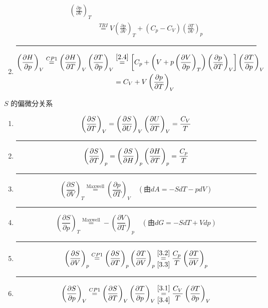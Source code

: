 \begin{example}
\begin{enumerate}
\begin{align*}
            \left(\frac{\partial p}{\partial V}\right)_T \\
            &\overset{TRI}{=}V\left(\frac{\partial p}{\partial V}\right)_T
            +(C_p-C_V)\left(\frac{\partial T}{\partial V}\right)_p
        \end{align*}
        \hrule
        \item \begin{align*}
            \left(\frac{\partial H}{\partial p}\right)_V 
            \overset{CP1}{=} \left(\frac{\partial H}{\partial T}\right)_V 
            \left(\frac{\partial T}{\partial p}\right)_V 
            &\overset{\ref*{2.4}}{=} 
            \left[ C_p + \left( V + p\left(\frac{\partial V}{\partial p}\right)_T \right) 
            \left(\frac{\partial p}{\partial T}\right)_V \right] 
            \left(\frac{\partial T}{\partial p}\right)_V \\
            &=C_V + V\left(\frac{\pa p}{\pa T}\right)_V
        \end{align*}
    \end{enumerate}
\end{example}
\begin{example}
    \( S \) 的偏微分关系
    \begin{enumerate}
        \item\label{3.1} \[\left(\frac{\partial S}{\partial T}\right)_V 
        =\left(\frac{\partial S}{\partial U}\right)_V\left(\frac{\partial U}{\partial T}\right)_V
        = \frac{C_V}{T} 
        \]\hrule
        \item\label{3.2} \[\left(\frac{\partial S}{\partial T}\right)_p 
        =\left(\frac{\partial S}{\partial H}\right)_p\left(\frac{\partial H}{\partial T}\right)_p
        = \frac{C_p}{T} 
        \]\hrule
        \item\label{3.3} \[\left(\frac{\partial S}{\partial V}\right)_T 
        \overset{\text{Maxwell}}{=} \left(\frac{\partial p}{\partial T}\right)_V \quad (\text{由}  dA = -S dT - p dV ) \]
        \hrule
        \item\label{3.4} \[\left(\frac{\partial S}{\partial p}\right)_T 
        \overset{\text{Maxwell}}{=} -\left(\frac{\partial V}{\partial T}\right)_p \quad (\text{由}  dG = -S dT + V dp ) \]
        \hrule
        \item\label{3.5} \begin{align*}
            \left(\frac{\partial S}{\partial V}\right)_p 
            \overset{CP1}{=} \left(\frac{\partial S}{\partial T}\right)_p \left(\frac{\partial T}{\partial V}\right)_p
            \overunderset{\ref*{3.2}}{\ref*{3.3}}{=} 
            \frac{C_p}{T} \left(\frac{\partial T}{\partial V}\right)_p  
        \end{align*}
        \hrule
        \item\label{3.6} \begin{align*}
            \left(\frac{\partial S}{\partial p}\right)_V 
            \overset{CP1}{=} \left(\frac{\partial S}{\partial T}\right)_V \left(\frac{\partial T}{\partial p}\right)_V
            \overunderset{\ref*{3.1}}{\ref*{3.4}}{=} 
            \frac{C_V}{T} \left(\frac{\partial T}{\partial p}\right)_V
        \end{align*}
    \end{enumerate}
\end{example}
